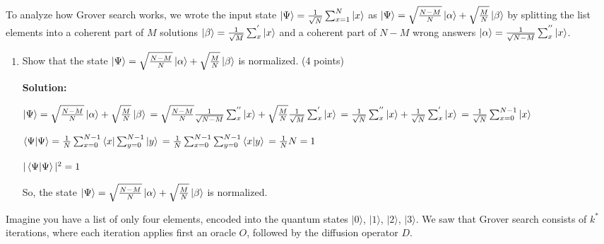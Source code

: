 \documentclass[12pt]{article}
\begin{document}
To analyze how Grover search works, we wrote the input state $\ket{\Psi} = \frac{1}{\sqrt{N}}\sum_{x=1}^{N} \ket{x}$ as $\ket{\Psi} = \sqrt{\frac{N-M}{N}}\ket{\alpha} + \sqrt{\frac{M}{N}}\ket{\beta}$ by splitting the list elements into a coherent part of $M$ solutions $\ket{\beta} = \frac{1}{\sqrt{M}}\sum_{x}^{'} \ket{x}$ and a coherent part of $N-M$ wrong answers $\ket{\alpha} = \frac{1}{\sqrt{N-M}}\sum_{x}^{''} \ket{x}$.


\begin{enumerate}[start=3]
    \item Show that the state $\ket{\Psi} = \sqrt{\frac{N-M}{N}}\ket{\alpha} + \sqrt{\frac{M}{N}}\ket{\beta}$ is normalized. (4 points)

          \textbf{Solution:}



          $\ket{\Psi} = \sqrt{\frac{N-M}{N}}\ket{\alpha} + \sqrt{\frac{M}{N}}\ket{\beta}
              \\=\sqrt{\frac{N-M}{N}}\frac{1}{\sqrt{N-M}}\sum_{x}^{''} \ket{x}+\sqrt{\frac{M}{N}}\frac{1}{\sqrt{M}}\sum_{x}^{'} \ket{x}
              \\=\frac{1}{\sqrt{N}}\sum_{x}^{''} \ket{x}+\frac{1}{\sqrt{N}}\sum_{x}^{'} \ket{x}
              \\=\frac{1}{\sqrt{N}}\sum_{x=0}^{N-1} \ket{x}
          $


          $\braket{\Psi|\Psi} = \frac{1}{N}\sum_{x=0}^{N-1} \bra{x}\sum_{y=0}^{N-1} \ket{y}
              \\=\frac{1}{N}\sum_{x=0}^{N-1} \sum_{y=0}^{N-1} \braket{x|y}
              \\=\frac{1}{N}N
              \\=1$






          $|\braket{\Psi|\Psi}|^2 = 1$


          So, the state $\ket{\Psi} = \sqrt{\frac{N-M}{N}}\ket{\alpha} + \sqrt{\frac{M}{N}}\ket{\beta}$ is normalized.

\end{enumerate}



Imagine you have a list of only four elements, encoded into the quantum states $|0\rangle$, $|1\rangle$, $|2\rangle$, $|3\rangle$. We saw that Grover search consists of $k^*$ iterations, where each iteration applies first an oracle $O$, followed by the diffusion operator $D$.
\end{document}
